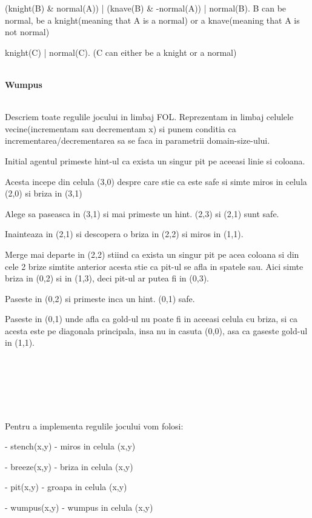 \documentclass[a4paper,12pt]{report}
\begin{document}
(knight(B) & normal(A)) | (knave(B) & -normal(A)) | normal(B). B can be normal, be a knight(meaning that A is a normal) or a knave(meaning that A is not normal)

knight(C) | normal(C). (C can either be a knight or a normal)\\

\\
\begin{Large}
 \textbf{Wumpus}\\
\end{Large}\\
Descriem toate regulile jocului in limbaj FOL. 
Reprezentam in limbaj celulele vecine(incrementam sau decrementam x) si punem conditia ca incrementarea/decrementarea sa se faca in parametrii domain-size-ului.

Initial agentul primeste hint-ul ca exista un singur pit pe aceeasi linie si coloana.

Acesta incepe din celula (3,0) despre care stie ca este safe si simte miros in celula (2,0) si briza in (3,1)

Alege sa paseasca in (3,1) si mai primeste un hint. (2,3) si (2,1) sunt safe.

Inainteaza in (2,1) si descopera o briza in (2,2) si miros in (1,1).

Merge mai departe in (2,2) stiind ca exista un singur pit pe acea coloana si din cele 2 brize simtite anterior acesta stie ca pit-ul se afla in spatele sau. Aici simte briza in (0,2) si in (1,3), deci pit-ul ar putea fi in (0,3). 

Paseste in (0,2) si primeste inca un hint. (0,1) safe. 

Paseste in (0,1) unde afla ca gold-ul nu poate fi in aceeasi celula cu briza, si ca acesta este pe diagonala principala, insa nu in casuta (0,0), asa ca gaseste gold-ul in (1,1).
\\
\\
\\
\\
\\
\\
\\
Pentru a implementa regulile jocului vom folosi:

- stench(x,y) - miros in celula (x,y)

- breeze(x,y) - briza in celula (x,y)

- pit(x,y) - groapa in celula (x,y)

- wumpus(x,y) - wumpus in celula (x,y)
\end{document}
